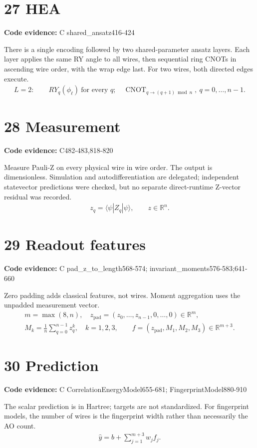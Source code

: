 \documentclass[10pt,a4paper]{article}
\newcommand{\stage}[2]{\section*{#1}\textbf{Code evidence:} #2\par}
\begin{document}
\par\noindent\begin{minipage}{\linewidth}
\stage{27 HEA}{C shared\_ansatz416-424}
There is a single encoding followed by two shared-parameter ansatz layers. Each layer applies the same RY angle to all wires, then sequential ring CNOTs in ascending wire order, with the wrap edge last. For two wires, both directed edges execute.
\[
\begin{gathered}
L=2:\qquad RY_q(\phi_\ell)\ \text{for every }q;\quad \operatorname{CNOT}_{q\to(q+1)\bmod n},\ q=0,\ldots,n-1.
\end{gathered}
\]
\end{minipage}\par\vspace{4pt}
\par\noindent\begin{minipage}{\linewidth}
\stage{28 Measurement}{C482-483,818-820}
Measure Pauli-Z on every physical wire in wire order. The output is dimensionless. Simulation and autodifferentiation are delegated; independent statevector predictions were checked, but no separate direct-runtime Z-vector residual was recorded.
\[
\begin{gathered}
z_q=\langle\psi|Z_q|\psi\rangle,\qquad z\in\mathbb R^n.
\end{gathered}
\]
\end{minipage}\par\vspace{4pt}
\par\noindent\begin{minipage}{\linewidth}
\stage{29 Readout features}{C pad\_z\_to\_length568-574; invariant\_moments576-583;641-660}
Zero padding adds classical features, not wires. Moment aggregation uses the unpadded measurement vector.
\[
\begin{gathered}
m=\max(8,n),\quad z_{\mathrm{pad}}=(z_0,\ldots,z_{n-1},0,\ldots,0)\in\mathbb R^m,\\ M_k=\frac1n\sum_{q=0}^{n-1}z_q^k,\quad k=1,2,3,\qquad f=(z_{\mathrm{pad}},M_1,M_2,M_3)\in\mathbb R^{m+3}.
\end{gathered}
\]
\end{minipage}\par\vspace{4pt}
\par\noindent\begin{minipage}{\linewidth}
\stage{30 Prediction}{C CorrelationEnergyModel655-681; FingerprintModel880-910}
The scalar prediction is in Hartree; targets are not standardized. For fingerprint models, the number of wires is the fingerprint width rather than necessarily the AO count.
\[
\begin{gathered}
\widehat y=b+\sum_{j=1}^{m+3}w_j f_j.
\end{gathered}
\]
\end{minipage}\par\vspace{4pt}
\end{document}
